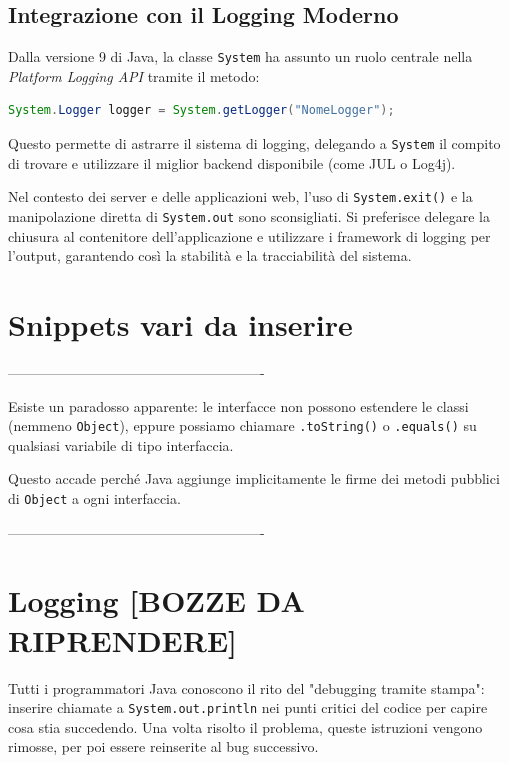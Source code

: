 \subsection{Integrazione con il Logging Moderno}

Dalla versione 9 di Java, la classe \texttt{System} ha assunto un ruolo centrale nella \textit{Platform Logging API} tramite il metodo:
\begin{lstlisting}[language=Java]
System.Logger logger = System.getLogger("NomeLogger");
\end{lstlisting}
Questo permette di astrarre il sistema di logging, delegando a \texttt{System} il compito di trovare e utilizzare il miglior backend disponibile (come JUL o Log4j).

\begin{warningbox}
Nel contesto dei server e delle applicazioni web, l'uso di \texttt{System.exit()} e la manipolazione diretta di \texttt{System.out} sono sconsigliati. Si preferisce delegare la chiusura al contenitore dell'applicazione e utilizzare i framework di logging per l'output, garantendo così la stabilità e la tracciabilità del sistema.
\end{warningbox}

\section{Snippets vari da inserire}
-------------------------------------------------------

Esiste un paradosso apparente: le interfacce non possono estendere le classi (nemmeno \texttt{Object}), eppure possiamo chiamare \texttt{.toString()} o \texttt{.equals()} su qualsiasi variabile di tipo interfaccia. 

Questo accade perché Java aggiunge implicitamente le firme dei metodi pubblici di \texttt{Object} a ogni interfaccia.


-------------------------------------------------------

\section{Logging [BOZZE DA RIPRENDERE]}

Tutti i programmatori Java conoscono il rito del "debugging tramite stampa": inserire chiamate a \texttt{System.out.println} nei punti critici del codice per capire cosa stia succedendo. Una volta risolto il problema, queste istruzioni vengono rimosse, per poi essere reinserite al bug successivo.

